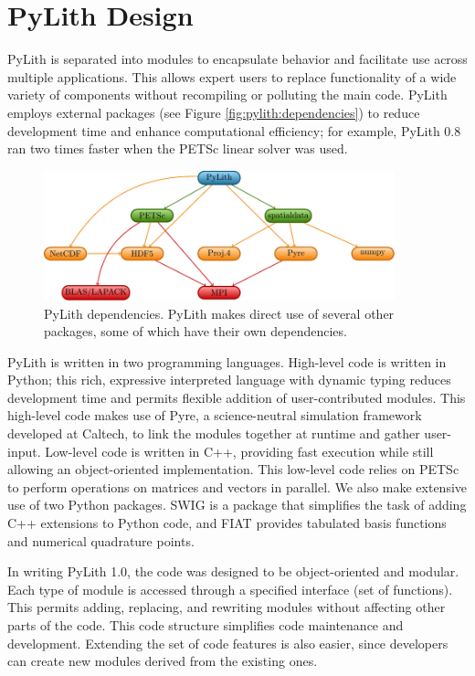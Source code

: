 \chapter{PyLith Design}

PyLith is separated into modules to encapsulate behavior and facilitate
use across multiple applications. This allows expert users to replace
functionality of a wide variety of components without recompiling
or polluting the main code. PyLith employs external packages (see
Figure \vref{fig:pylith:dependencies}) to reduce development time
and enhance computational efficiency; for example, PyLith 0.8 ran
two times faster when the PETSc linear solver was used.

\begin{figure}[htbp]
  \includegraphics[width=4in]{implementation/figs/packages}
  \caption{PyLith dependencies. PyLith makes direct use of several
    other packages, some of which have their own dependencies.}
  \label{fig:pylith:dependencies}
\end{figure}

PyLith is written in two programming languages. High-level code is
written in Python; this rich, expressive interpreted language with
dynamic typing reduces development time and permits flexible addition
of user-contributed modules. This high-level code makes use of Pyre, a
science-neutral simulation framework developed at Caltech, to link the
modules together at runtime and gather user-input. Low-level code is
written in C++, providing fast execution while still allowing an
object-oriented implementation. This low-level code relies on PETSc to
perform operations on matrices and vectors in parallel. We also make
extensive use of two Python packages. SWIG is a package that
simplifies the task of adding C++ extensions to Python code, and FIAT
provides tabulated basis functions and numerical quadrature points.

In writing PyLith 1.0, the code was designed to be object-oriented and
modular. Each type of module is accessed through a specified interface
(set of functions). This permits adding, replacing, and rewriting
modules without affecting other parts of the code. This code structure
simplifies code maintenance and development. Extending the set of code
features is also easier, since developers can create new modules
derived from the existing ones.


